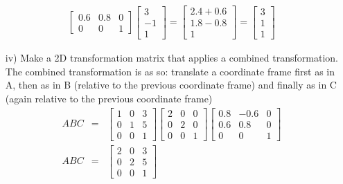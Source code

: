 \begin{itemize}
{\begin{eqnarray*}
\begin{bmatrix}
                0.6 & 0.8 & 0\\
                0 & 0 & 1
                \end{bmatrix}
                \begin{bmatrix}
                3\\-1\\1
                \end{bmatrix}
                = \begin{bmatrix}
                  2.4 + 0.6\\
                  1.8 - 0.8\\
                  1
                  \end{bmatrix}
                  = \begin{bmatrix}3\\1\\1\end{bmatrix}
        \end{eqnarray*}
    }
    \item[iv)]{
    Make a 2D transformation matrix that applies a combined transformation. The
    combined transformation is as so: translate a coordinate frame first as in
    A, then as in B (relative to the previous coordinate frame) and finally as
    in C (again relative to the previous coordinate frame)
    \begin{eqnarray*} 
        ABC &=& 
            \begin{bmatrix}
            1 & 0 & 3\\
            0 & 1 & 5\\
            0 & 0 & 1
            \end{bmatrix}
            \begin{bmatrix}
            2 & 0 & 0\\
            0 & 2 & 0\\
            0 & 0 & 1
            \end{bmatrix}
            \begin{bmatrix}
            0.8 & -0.6 & 0\\
            0.6 & 0.8 & 0\\
            0 & 0 & 1
            \end{bmatrix}\\
        ABC&=&
            \begin{bmatrix}
            2 & 0 & 3\\
            0 & 2 & 5\\
            0 & 0 & 1
            \end{bmatrix}

\end{eqnarray*}}
\end{itemize}
